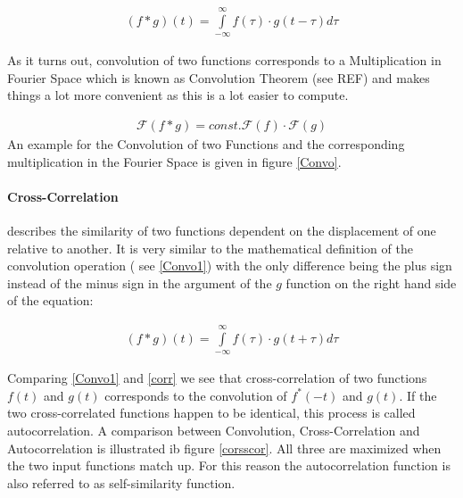 \begin{align}
(f*g)(t)=\int\limits_{-\infty}^{\infty} f(\tau)\cdot g(t-\tau) d\tau \label{Convo1}
\end{align}

As it turns out, convolution of two functions corresponds to a Multiplication in Fourier Space which is known as Convolution Theorem (see REF) and makes things a lot more convenient as this is a lot easier to compute.

\begin{align}
\mathscr{F}(f*g)=const. \mathscr{F}(f)\cdot \mathscr{F}(g)
\end{align}
 An example for the Convolution of two Functions and the corresponding multiplication in the Fourier Space is given in figure \ref{Convo}.
 

\paragraph{Cross-Correlation} describes the similarity of two functions dependent on the displacement of one relative to another. It is very similar to the mathematical definition of the convolution operation ( see \ref{Convo1}) with the only difference being the plus sign instead of the minus sign in the argument of the $g$ function on the right hand side of the equation:

\begin{align}
(f*g)(t)=\int\limits_{-\infty}^{\infty} f(\tau)\cdot g(t+\tau) d\tau \label{corr}
\end{align}

Comparing \ref{Convo1} and \ref{corr} we see that cross-correlation of two functions $f(t)$ and $g(t)$ corresponds to the convolution of $f^*(-t)$ and $g(t)$. If the two cross-correlated functions happen to be identical, this process is called autocorrelation.
A comparison between Convolution, Cross-Correlation and Autocorrelation is illustrated ib figure \ref{corsscor}. All three are maximized when the two input functions match up. For this reason the autocorrelation function is also referred to as self-similarity function.

 

